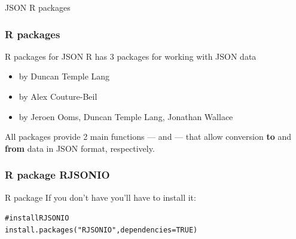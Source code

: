 \documentclass{beamer}\usepackage[]{graphicx}\usepackage[]{color}
\makeatletter
\newcommand{\hlnum}[1]{\textcolor[rgb]{0.063,0.58,0.627}{#1}}%
\newcommand{\hlstr}[1]{\textcolor[rgb]{0.063,0.58,0.627}{#1}}%
\newcommand{\hlcom}[1]{\textcolor[rgb]{0.588,0.588,0.588}{#1}}%
\newcommand{\hlstd}[1]{\textcolor[rgb]{0.196,0.196,0.196}{#1}}%
\newcommand{\hlkwc}[1]{\textcolor[rgb]{0,0.631,0.314}{#1}}%
\newcommand{\hlkwd}[1]{\textcolor[rgb]{0.78,0.227,0.412}{#1}}%
\newenvironment{kframe}{%
 \def\at@end@of@kframe{}%
 \ifinner\ifhmode%
  \def\at@end@of@kframe{\end{minipage}}%
  \begin{minipage}{\columnwidth}%
 \fi\fi%
 \def\FrameCommand##1{\hskip\@totalleftmargin \hskip-\fboxsep
 \colorbox{shadecolor}{##1}\hskip-\fboxsep
     \hskip-\linewidth \hskip-\@totalleftmargin \hskip\columnwidth}%
 \MakeFramed {\advance\hsize-\width
   \@totalleftmargin\z@ \linewidth\hsize
   \@setminipage}}%
 {\par\unskip\endMakeFramed%
 \at@end@of@kframe}
\newenvironment{knitrout}{}{} %
\makeatother
\begin{document}

\begin{frame}
 \begin{center}
  \Huge{\textcolor{mandarina}{JSON R packages}}
 \end{center}
\end{frame}


\begin{frame}
\frametitle{R packages}

\begin{block}{R packages for JSON}
R has 3 packages for working with JSON data

\begin{itemize}
 \item {} by Duncan Temple Lang
 \item {} by Alex Couture-Beil
 \item {} by Jeroen Ooms, Duncan Temple Lang, Jonathan Wallace
\end{itemize}
\end{block}

All packages provide 2 main functions --- and --- that allow conversion \textbf{to} and \textbf{from} data in JSON format, respectively. \\

\end{frame}


\begin{frame}[fragile]
\frametitle{R package RJSONIO}

\begin{block}{R package }
If you don't have  you'll have to install it:
\begin{knitrout}\small
{}\color{fgcolor}\begin{kframe}
\begin{alltt}
\hlcom{# install RJSONIO}
\hlkwd{install.packages}\hlstd{(}\hlstr{"RJSONIO"}\hlstd{,} \hlkwc{dependencies} \hlstd{=} \hlnum{TRUE}\hlstd{)}
\end{alltt}
\end{kframe}
\end{knitrout}
\end{block}

\end{frame}
\end{document}
